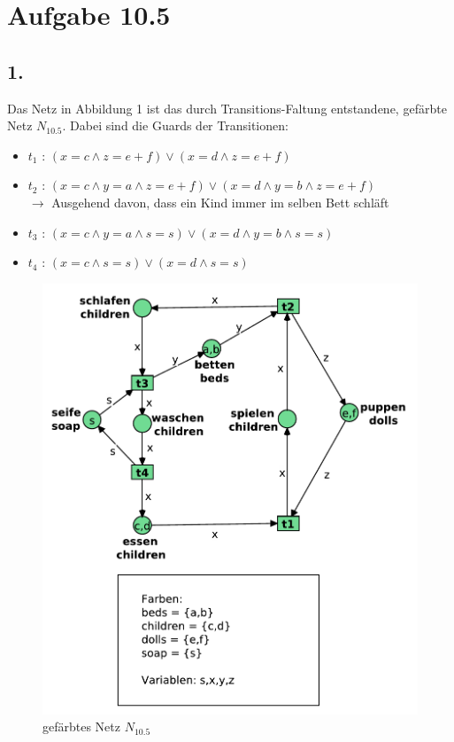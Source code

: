 \documentclass[12pt, paper=a4]{article}
\begin{document}
\section*{Aufgabe 10.5}
\subsection*{1.}

Das Netz in Abbildung 1 ist das durch Transitions-Faltung entstandene, gefärbte Netz $N_{10.5}$. Dabei sind die Guards der Transitionen:\\

\begin{itemize}
\item $t_1$ : $(x=c \land z=e+f) \lor (x=d \land z=e+f)$
\item $t_2$ : $(x=c \land y=a \land z=e+f) \lor (x=d \land y=b \land z=e+f)$\\
			$\rightarrow$ Ausgehend davon, dass ein Kind immer im selben Bett schläft
\item $t_3$ : $(x=c \land y=a \land s=s) \lor (x=d \land y=b \land s=s)$
\item $t_4$ : $(x=c \land s=s) \lor (x=d \land s=s)$
\end{itemize}

\begin{figure}[h!]
\centering
\includegraphics[scale=0.8]{folded.pdf}
\caption{gefärbtes Netz $N_{10.5}$}

\end{figure}
\end{document}
